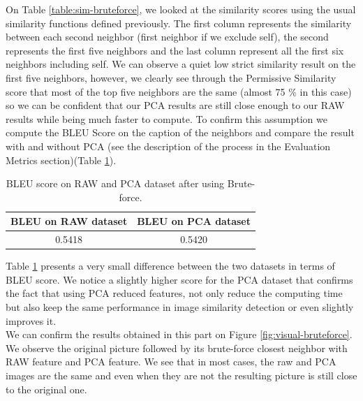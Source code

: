 \documentclass[a4paper]{article}
\begin{document}
	On Table \ref{table:sim-bruteforce}, we looked at the similarity scores using the usual similarity functions defined previously. The first column represents the similarity between each second neighbor (first neighbor if we exclude self), the second represents the first five neighbors and the last column represent all the first six neighbors including self. We can observe a quiet low strict similarity result on the first five neighbors, however, we clearly see through the Permissive Similarity score that most of the top five neighbors are the same (almost 75 \% in this case) so we can be confident that our PCA results are still close enough to our RAW results while being much faster to compute. To confirm this assumption we compute the BLEU Score on the caption of the neighbors and compare the result with and without PCA (see the description of the process in the Evaluation Metrics section)(Table \ref{table:bleu-bruteforce}). \\
	
	\begin{table}[h]
		\centering
		\begin{tabular}{ | c | c |}
		\hline
			BLEU on RAW dataset & BLEU on PCA dataset \\ \hline
			0.5418 & 0.5420 \\ \hline
			
		\end{tabular}
		\caption{BLEU score on RAW and PCA dataset after using Brute-force.}
		\label{table:bleu-bruteforce}
	\end{table}

Table \ref{table:bleu-bruteforce} presents a very small difference between the two datasets in terms of BLEU score. We notice a slightly higher score for the PCA dataset that confirms the fact that using PCA reduced features, not only reduce the computing time but also keep the same performance in image similarity detection or even slightly improves it.\\

We can confirm the results obtained in this part on Figure \ref{fig:visual-bruteforce}. We observe the original picture followed by its brute-force closest neighbor with RAW feature and PCA feature. We see that in most cases, the raw and PCA images are the same and even when they are not the resulting picture is still close to the original one.
\end{document}
